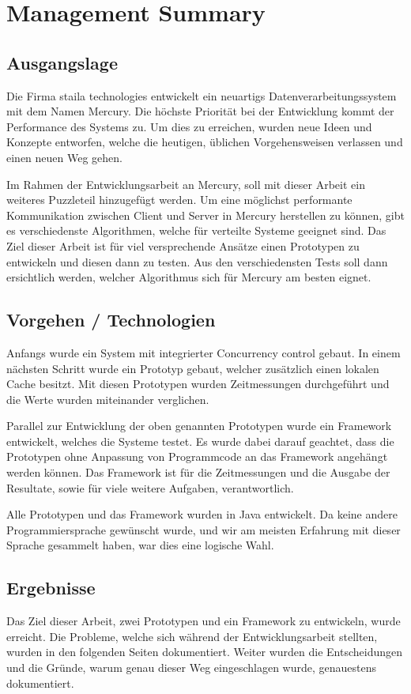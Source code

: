 \chapter*{Management Summary}

\section*{Ausgangslage}
Die Firma staila technologies ent\-wick\-elt ein neuartigs Daten\-ver\-arbeitungs\-system mit dem Namen Mercury. Die höchste Priorität bei der Entwicklung kommt der Performance des Systems zu. Um dies zu erreichen, wurden neue Ideen und Konzepte entworfen, welche die heutigen, üblichen Vorgehensweisen verlassen und einen neuen Weg gehen.

Im Rahmen der Entwicklungsarbeit an Mercury, soll mit dieser Arbeit ein weiteres Puzzleteil hinzugefügt werden. Um eine möglichst performante Kommunikation zwischen Client und Server in Mercury herstellen zu können, gibt es verschiedenste Algorithmen, welche für verteilte Systeme geeignet sind. Das Ziel dieser Arbeit ist für viel versprechende Ansätze einen Prototypen zu entwickeln und diesen dann zu testen. Aus den verschiedensten Tests soll dann ersichtlich werden, welcher Algorithmus sich für Mercury am besten eignet.

\section*{Vorgehen / Technologien}
Anfangs wurde ein System mit integrierter Concurrency control gebaut. In einem nächsten Schritt wurde ein Prototyp gebaut, welcher zusätzlich einen lokalen Cache besitzt. Mit diesen Prototypen wurden Zeitmessungen durchgeführt und die Werte wurden miteinander verglichen.

Parallel zur Ent\-wick\-lung der oben ge\-nannten Pro\-to\-typ\-en wur\-de ein Frame\-work entwickelt, welches die Systeme testet. Es wurde dabei darauf geachtet, dass die Prototypen ohne Anpassung von Programmcode an das Framework angehängt werden können. Das Framework ist für die Zeitmessungen und die Ausgabe der Resultate, sowie für viele weitere Aufgaben, verantwortlich.

Alle Prototypen und das Framework wurden in Java entwickelt. Da keine andere Programmiersprache gewünscht wurde, und wir am meisten Erfahrung mit dieser Sprache gesammelt haben, war dies eine logische Wahl.

\section*{Ergebnisse}
Das Ziel dieser Arbeit, zwei Prototypen und ein Framework zu entwickeln, wurde erreicht. Die Probleme, welche sich während der Entwicklungsarbeit stellten, wurden in den folgenden Seiten dokumentiert. Weiter wurden die Entscheidungen und die Gründe, warum genau dieser Weg eingeschlagen wurde, genauestens dokumentiert.

